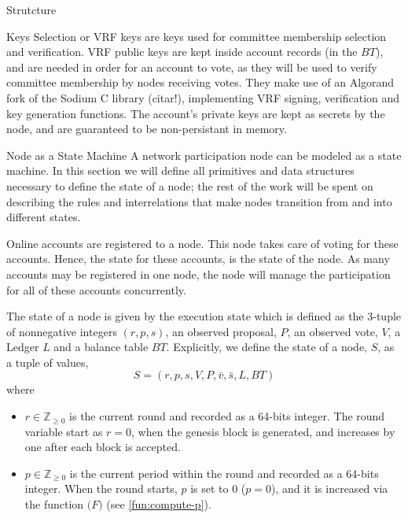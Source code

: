 \documentclass[10pt,a4paper]{article}
\begin{document}
\begin{section}{Strutcture}
\begin{subsection}{Keys}
    Selection or VRF keys are keys used for committee membership selection and verification.
    VRF public keys are kept inside account records (in the $BT$),
    and are needed in order for an account to vote, as they will be
    used to verify committee membership by nodes receiving votes.
    They make use of an Algorand fork of the Sodium C library (citar!), implementing VRF signing, verification and
    key generation functions.
    The account's private keys are kept as secrets by the node, and are guaranteed to be non-persistant in memory.




\end{subsection}
\begin{subsection}{Node as a State Machine}
A network participation node can be modeled as a state machine.
In this section we will define all primitives and data structures necessary to define the state
of a node; the rest of the work will be spent on describing the rules and interrelations that
make nodes transition from and into different states.

Online accounts are registered to a node. This node takes care of voting for these accounts.
Hence, the state for these accounts, is the state of the node. As many accounts may be 
registered in one node, the node will manage the participation for all of these accounts 
concurrently.

The {\sf state of a node} 
is given by the {\sf execution state} which is defined as the 3-tuple of nonnegative integers $(r, p, s)$, 
an observed proposal, $P$, 
an observed vote, $V$, 
a Ledger $L$ and 
a balance table $BT$.
Explicitly, we define the state of a node, $S$, as a tuple of values, 
$$
S = (r, p, s, V, P, \bar{v}, \bar{s}, L, BT)
$$ 
where
\begin{itemize}
    \item 
    $r\in\mathbb{Z}_{\ge 0}$ is the current round and recorded as a 64-bits integer. 
    The round variable start as $r=0$, when the genesis block is generated, and increases
    by one after each block is accepted.
    
    \item 
    $p\in\mathbb{Z}_{\ge 0}$ is the current period within the round and recorded as 
    a 64-bits integer. When the round starts, $p$ is set to 0 ($p=0$), and it is 
    increased via the function $\mathcal(F)$ (see \ref{fun:compute-p}).
    

\end{itemize}
\end{subsection}
\end{section}
\end{document}
